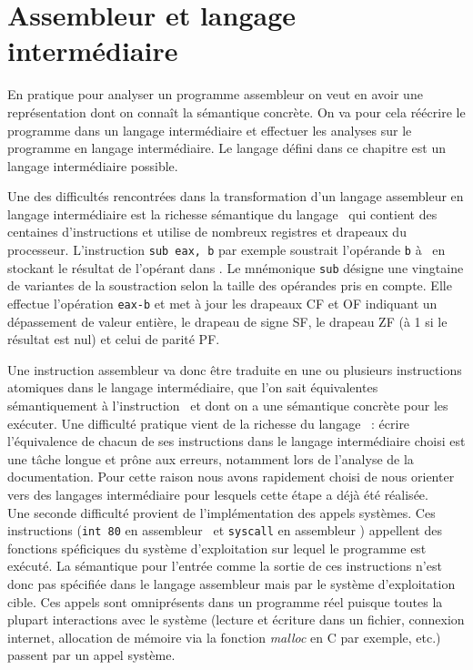 \section{Assembleur et langage intermédiaire}
En pratique pour analyser un programme assembleur on veut en avoir une représentation dont on connaît la sémantique concrète.
On va pour cela réécrire le programme dans un langage intermédiaire et effectuer les analyses sur le programme en langage intermédiaire.
Le langage défini dans ce chapitre est un langage intermédiaire possible.

Une des difficultés rencontrées dans la transformation d'un langage assembleur en langage intermédiaire est la richesse sémantique du langage \xq\ qui contient des centaines d'instructions et utilise de nombreux registres et drapeaux du processeur.
L'instruction \texttt{sub eax, b} par exemple soustrait l'opérande \texttt{b} à \eax\  en stockant le résultat de l'opérant dans \eax.
Le mnémonique \texttt{sub} désigne une vingtaine de variantes de la soustraction selon la taille des opérandes pris en compte. Elle effectue l'opération \texttt{eax-b} et met à jour les drapeaux CF et OF indiquant un dépassement de valeur entière, le drapeau de signe SF, le drapeau ZF (à 1 si le résultat est nul) et celui de parité PF.

Une instruction assembleur va donc être traduite en une ou plusieurs instructions atomiques dans le langage intermédiaire, que l'on sait équivalentes sémantiquement à l'instruction \xq\ et dont on a une sémantique concrète pour les exécuter.
Une difficulté pratique vient de la richesse du langage \xq\ : écrire l'équivalence de chacun de ses instructions dans le langage intermédiaire choisi est une tâche longue et prône aux erreurs, notamment lors de l'analyse de la documentation. 
Pour cette raison nous avons rapidement choisi de nous orienter vers des langages intermédiaire pour lesquels cette étape a déjà été réalisée.
\\

Une seconde difficulté provient de l'implémentation des appels systèmes. 
Ces instructions (\texttt{int 80} en assembleur \xq\ et \texttt{syscall} en assembleur \xs) appellent des fonctions spéficiques du système d'exploitation sur lequel le programme est exécuté.
La sémantique pour l'entrée comme la sortie de ces instructions n'est donc pas spécifiée dans le langage assembleur mais par le système d'exploitation cible.
Ces appels sont omniprésents dans un programme réel puisque toutes la plupart interactions avec le système (lecture et écriture dans un fichier, connexion internet, allocation de mémoire via la fonction \emph{malloc} en C par exemple, etc.) passent par un appel système.

